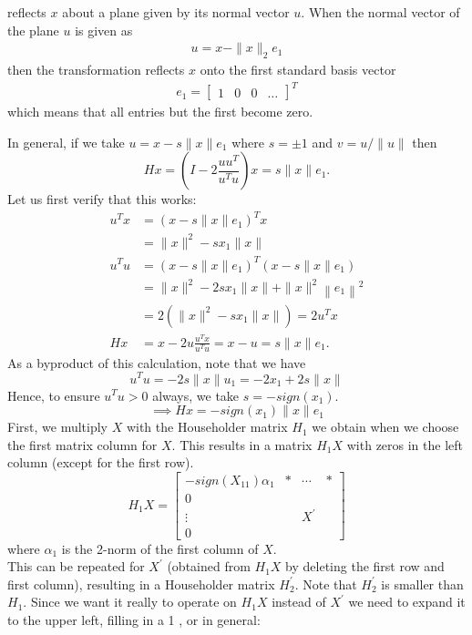 \documentclass[journal,12pt,twocolumn]{IEEEtran}
\begin{document}
    reflects $x$ about a plane given by its normal vector $u$. When the normal vector of the plane $u$ is given as
    \begin{align*}
        u=x-\|x\|_{2} e_{1}
    \end{align*}
    then the transformation reflects $x$ onto the first standard basis vector
    \begin{align*}
            e_{1}=\left[\begin{array}{llll}
            1 & 0 & 0 & \ldots
        \end{array}\right]^{T}
    \end{align*}
    which means that all entries but the first become zero.
    
    In general, if we take $u=x-s\|x\| e_{1}$ where $s=\pm 1$ and $v=u /\|u\|$ then
    $$
    H x=\left(I-2 \frac{u u^{T}}{u^{T} u}\right) x=s\|x\| e_{1} .
    $$
    Let us first verify that this works:
    \begin{align*}
    u^{T} x &=\left(x-s\|x\| e_{1}\right)^{T} x \\
    &=\|x\|^{2}-s x_{1}\|x\| \\
    u^{T} u &=\left(x-s\|x\| e_{1}\right)^{T}\left(x-s\|x\| e_{1}\right) \\
    &=\|x\|^{2}-2 s x_{1}\|x\|+\|x\|^{2}\left\|e_{1}\right\|^{2} \\
    &=2\left(\|x\|^{2}-s x_{1}\|x\|\right)=2 u^{T} x \\
    H x &=x-2 u \frac{u^{T} x}{u^{T} u}=x-u=s\|x\| e_{1} .
    \end{align*}
    As a byproduct of this calculation, note that we have
    $$
    u^{T} u=-2 s\|x\| u_{1} = -2x_1 + 2 s \|x\|
    $$
    Hence, to ensure $u^{T} u > 0$ always, we take $s = -sign(x_1)$.\\
    $$\implies Hx = -sign(x_1) \|x\| e_1$$
    First, we multiply $X$ with the Householder matrix $H_{1}$ we obtain when we choose the first matrix column for $X$. This results in a matrix $H_{1} X$ with zeros in the left column (except for the first row).
    $$
    H_{1} X=\left[\begin{array}{cccc}
    -sign(X_{11})\alpha_{1} & * & \cdots & * \\
    0 & & & \\
    \vdots & & X^{\prime} & \\
    0 & & &
    \end{array}\right]
    $$
    where $\alpha_1$ is the 2-norm of the first column of $X$.\\
    This can be repeated for $X^{\prime}$ (obtained from $H_{1} X$ by deleting the first row and first column), resulting in a Householder matrix $H_{2}^{\prime} .$ Note that $H_{2}^{\prime}$ is smaller than $H_{1}$. Since we want it really to operate on $H_{1} X$ instead of $X^{\prime}$ we need to expand it to the upper left, filling in a 1 , or in general:
\end{document}
